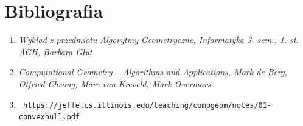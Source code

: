 \documentclass[11pt]{article}
\theoremstyle{remark} \newtheorem{definition}{def.}
\theoremstyle{definition} \newtheorem{twierdzenie}{tw.}
\begin{document}
\section{Bibliografia}

\begin{enumerate}
    \item   \emph{Wykład z przedmiotu Algorytmy Geometryczne, Informatyka 3. sem., 1. st. AGH, Barbara Głut}
    \item   \emph{Computational Geometry -- Algorithms and Applications, Mark de Berg, Otfried Cheong, Marc van Kreveld, Mark Overmars} 
    \item   \begin{verbatim} https://jeffe.cs.illinois.edu/teaching/compgeom/notes/01-convexhull.pdf \end{verbatim}
\end{enumerate}


\end{document}
